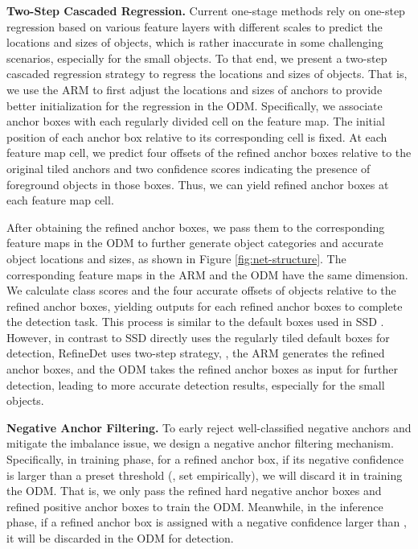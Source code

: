 \documentclass[10pt,twocolumn,letterpaper]{article}
\begin{document}
{\noindent \textbf{Two-Step Cascaded Regression.}}
Current one-stage methods \cite{DBLP:journals/corr/FuLRTB17,DBLP:conf/cvpr/KongSYLLC17,DBLP:conf/eccv/LiuAESRFB16} rely on one-step regression based on various feature layers with different scales to predict the locations and sizes of objects, which is rather inaccurate in some challenging scenarios, especially for the small objects. To that end, we present a two-step cascaded regression strategy to regress the locations and sizes of objects. That is, we use the ARM to first adjust the locations and sizes of anchors to provide better initialization for the regression in the ODM. Specifically, we associate  anchor boxes with each regularly divided cell on the feature map. The initial position of each anchor box relative to its corresponding cell is fixed. At each feature map cell, we predict four offsets of the refined anchor boxes relative to the original tiled anchors and two confidence scores indicating the presence of foreground objects in those boxes. Thus, we can yield  refined anchor boxes at each feature map cell.

After obtaining the refined anchor boxes, we pass them to the corresponding feature maps in the ODM to further generate object categories and accurate object locations and sizes, as shown in Figure \ref{fig:net-structure}. The corresponding feature maps in the ARM and the ODM have the same dimension. We calculate  class scores and the four accurate offsets of objects relative to the refined anchor boxes, yielding  outputs for each refined anchor boxes to complete the detection task. This process is similar to the default boxes used in SSD \cite{DBLP:conf/eccv/LiuAESRFB16}. However, in contrast to SSD \cite{DBLP:conf/eccv/LiuAESRFB16} directly uses the regularly tiled default boxes for detection, RefineDet uses two-step strategy, \ie, the ARM generates the refined anchor boxes, and the ODM takes the refined anchor boxes as input for further detection, leading to more accurate detection results, especially for the small objects.


{\noindent \textbf{Negative Anchor Filtering.}}
To early reject well-classified negative anchors and mitigate the imbalance issue, we design a negative anchor filtering mechanism. Specifically, in training phase, for a refined anchor box, if its negative confidence is larger than a preset threshold  (\ie, set  empirically), we will discard it in training the ODM. That is, we only pass the refined hard negative anchor boxes and refined positive anchor boxes to train the ODM. Meanwhile, in the inference phase, if a refined anchor box is assigned with a negative confidence larger than , it will be discarded in the ODM for detection.
\end{document}
